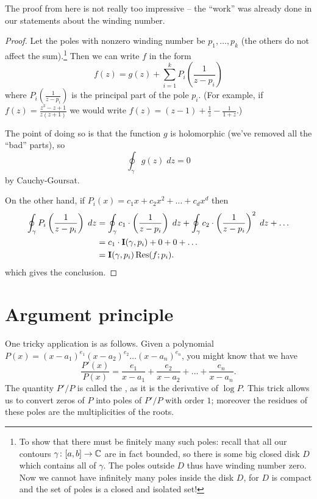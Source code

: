The proof from here is not really too impressive -- the ``work'' was already
done in our statements about the winding number.
\begin{proof}
	Let the poles with nonzero winding number be $p_1, \dots, p_k$ (the others do not affect the sum).\footnote{
		To show that there must be finitely many such poles: recall that all our contours $\gamma \colon [a,b] \to \mathbb C$
		are in fact bounded, so there is some big closed disk $D$ which contains all of $\gamma$.
		The poles outside $D$ thus have winding number zero.
		Now we cannot have infinitely many poles inside the disk $D$, for $D$ is compact and the
		set of poles is a closed and isolated set!}
	Then we can write $f$ in the form
	\[
		f(z) = g(z) + \sum_{i=1}^k P_i\left( \frac{1}{z-p_i} \right)
	\]
	where $P_i\left( \frac{1}{z-p_i} \right)$ is the principal part of the pole $p_i$.
	(For example, if $f(z) = \frac{z^3-z+1}{z(z+1)}$ we would write $f(z) = (z-1) + \frac1z - \frac1{1+z}$.)

	The point of doing so is that the function $g$ is holomorphic (we've removed all the ``bad'' parts), so
	\[ \oint_{\gamma} g(z) \; dz = 0 \]
	by Cauchy-Goursat.

	On the other hand, if $P_i(x) = c_1x + c_2x^2 + \dots + c_d x^d$ then
	\begin{align*}
		\oint_{\gamma} P_i\left( \frac{1}{z-p_i} \right) \; dz
		&=
		\oint_{\gamma} c_1 \cdot \left( \frac{1}{z-p_i} \right) \; dz
		+ \oint_{\gamma} c_2 \cdot \left( \frac{1}{z-p_i} \right)^2 \; dz
		+ \dots \\
		&= c_1 \cdot \operatorname{\mathbf I}(\gamma, p_i) + 0 + 0 + \dots \\
		&= \operatorname{\mathbf I}(\gamma, p_i) \operatorname{Res}(f; p_i).
	\end{align*}
	which gives the conclusion.
\end{proof}

\section{Argument principle}
One tricky application is as follows.
Given a polynomial $P(x) = (x-a_1)^{e_1}(x-a_2)^{e_2}\dots(x-a_n)^{e_n}$, you might know that we have
\[ \frac{P'(x)}{P(x)} = \frac{e_1}{x-a_1} + \frac{e_2}{x-a_2} + \dots + \frac{e_n}{x-a_n}. \]
The quantity $P'/P$ is called the , as it is the derivative of $\log P$.
This trick allows us to convert zeros of $P$ into poles of $P'/P$ with order $1$;
moreover the residues of these poles are the multiplicities of the roots.

